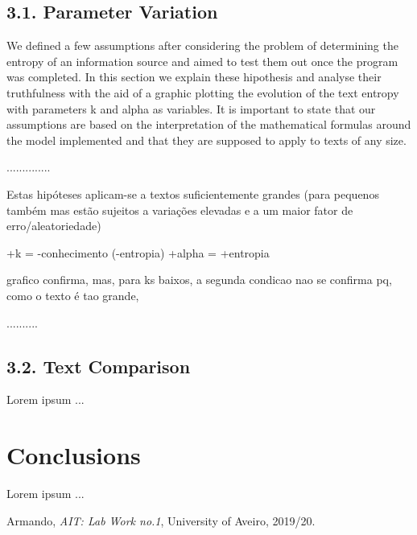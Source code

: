 \documentclass[12pt]{article}
\begin{document}
\subsection*{3.1. Parameter Variation}

We defined a few assumptions after considering the problem of determining
the entropy of an information source and aimed to test them out once the 
program was completed.
In this section we explain these hipothesis and analyse their truthfulness
with the aid of a graphic plotting the evolution of the text entropy with
parameters k and alpha as variables.
It is important to state that our assumptions are based on the interpretation
of the mathematical formulas around the model implemented and that they 
are supposed to apply to texts of any size.

..............


Estas hipóteses aplicam-se a textos suficientemente grandes
(para pequenos também mas estão sujeitos a variações elevadas e a um maior fator de erro/aleatoriedade)

+k = -conhecimento (-entropia)
+alpha = +entropia

grafico confirma, mas, para ks baixos, a segunda condicao nao se confirma
pq, como o texto é tao grande, 

..........

\subsection*{3.2. Text Comparison}

Lorem ipsum ...

\section*{Conclusions}

Lorem ipsum ...

\begin{thebibliography}{9}
  

    Armando,
    \textit{AIT: Lab Work no.1},
    University of Aveiro,
    2019/20.
  
\end{thebibliography}


\end{document}
